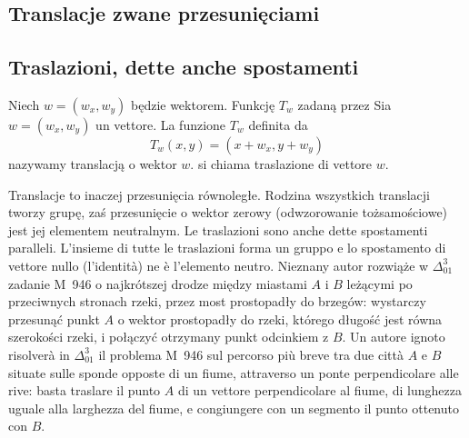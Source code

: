 
%

\subsection{Translacje zwane przesunięciami} %
\subsection{Traslazioni, dette anche spostamenti} %

\begin{definition}
[translacja] %
[traslazione] %
    Niech $w = (w_x, w_y)$ będzie wektorem. %
    Funkcję $T_w$ zadaną przez %
    Sia $w = (w_x, w_y)$ un vettore. %
    La funzione $T_w$ definita da %
    \begin{equation}
        T_w(x, y) = (x + w_x, y + w_y)
    \end{equation}
    nazywamy translacją o wektor $w$. %
    si chiama traslazione di vettore $w$. %
\end{definition}

Translacje to inaczej przesunięcia równoległe. %
Rodzina wszystkich translacji tworzy grupę, zaś przesunięcie o wektor zerowy (odwzorowanie tożsamościowe) jest jej elementem neutralnym. %
Le traslazioni sono anche dette spostamenti paralleli. %
L'insieme di tutte le traslazioni forma un gruppo e lo spostamento di vettore nullo (l'identità) ne è l'elemento neutro. %
Nieznany autor rozwiąże w $\Delta_{01}^{3}$ zadanie M~946 o najkrótszej drodze między miastami $A$ i $B$ leżącymi po przeciwnych stronach rzeki, przez most prostopadły do brzegów: wystarczy przesunąć punkt $A$ o wektor prostopadły do rzeki, którego długość jest równa szerokości rzeki, i połączyć otrzymany punkt odcinkiem z $B$. %
Un autore ignoto risolverà in $\Delta_{01}^{3}$ il problema M~946 sul percorso più breve tra due città $A$ e $B$ situate sulle sponde opposte di un fiume, attraverso un ponte perpendicolare alle rive: basta traslare il punto $A$ di un vettore perpendicolare al fiume, di lunghezza uguale alla larghezza del fiume, e congiungere con un segmento il punto ottenuto con $B$. %

%